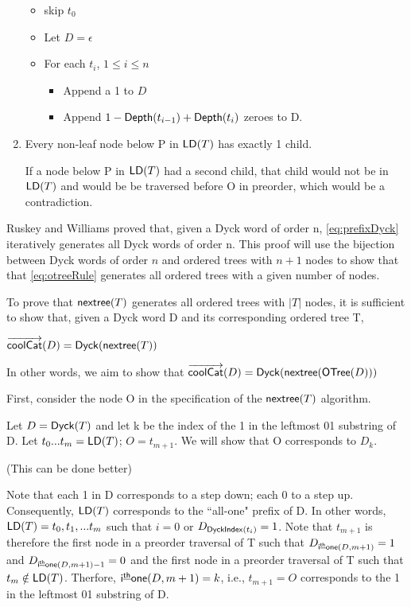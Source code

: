 \begin{enumerate}
	\begin{itemize}
 	\item skip $t_0$
	    \item Let $D=\epsilon$ %
	\item For each $t_i$, $1\le i \le n$
	\begin{itemize}
 	\item Append a 1 to $D$
	\item Append $1-\mathsf{Depth}{(t_{i-1})}+\mathsf{Depth}{(t_{i})}$ zeroes to D.
 \end{itemize}
 \end{itemize}
 \item Every non-leaf node below P in $\mathsf{LD}{(T)}$ has exactly 1 child.  

     If a node below P in $\mathsf{LD}{(T)}$ had a second child, that child would not be in $\mathsf{LD}{(T)}$ and would be be traversed before O in preorder, which would be a contradiction. 


\end{enumerate}

Ruskey and Williams proved that, given a Dyck word of order n, \ref{eq:prefixDyck} iteratively generates all Dyck words of order n.  This proof will use the bijection between Dyck words of order $n$ and ordered trees with $n+1$ nodes to show that that \ref{eq:otreeRule} generates all ordered trees with a given number of nodes.  

To prove that $\mathsf{nextree}{(T)}$ generates all ordered trees with $|T|$ nodes, it is sufficient to show that, given a Dyck word D and its corresponding ordered tree T, 

$\overrightarrow{\mathsf{coolCat}}{(D)}=\mathsf{Dyck}{(\mathsf{nextree}{(T)})}$

\bigskip


In other words, we aim to show that $\overrightarrow{\mathsf{coolCat}}{(D)}=\mathsf{Dyck}{(\mathsf{nextree}{(\mathsf{OTree}{(D)})})}$


First, consider the node O in the specification of the $\mathsf{nextree}{(T)}$ algorithm.  

Let $D=\mathsf{Dyck}{(T)}$ and let k be the index of the 1 in the leftmost 01 substring of D.  Let $t_0...t_m=\mathsf{LD}{(T)}$; $O=t_{m+1}$.  We will show that O corresponds to $D_k$.

(This can be done better) 

Note that each 1 in D corresponds to a step down; each 0 to a step up.  Consequently, $\mathsf{LD}{(T)}$ corresponds to the ``all-one" prefix of D.  In other words, $\mathsf{LD}{(T)}=t_0,t_1,...t_{m}$ such that $i=0$ or $D_{\mathsf{DyckIndex}{(t_i)}}=1$. Note that $t_{m+1}$ is therefore the first node in a preorder traversal of T such that $D_{\mathsf{i^{\underline{th}}one}({D}, m+1)}=1$ and $D_{\mathsf{i^{\underline{th}}one}({D}, m+1)-1}=0$ and the first node in a preorder traversal of T such that $t_m \notin \mathsf{LD}{(T)}$.  Therfore, $\mathsf{i^{\underline{th}}one}({D}, m+1)=k$, i.e., $t_{m+1}=O$ corresponds to the 1 in the leftmost 01 substring of D.



